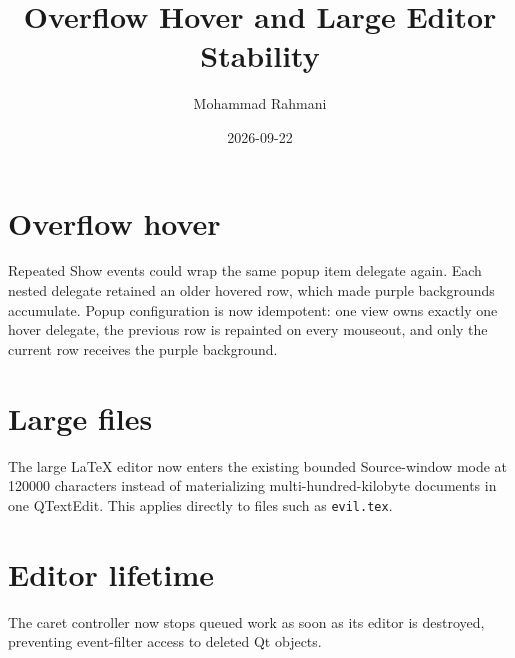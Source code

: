 \documentclass[a4paper]{article}
\title{Overflow Hover and Large Editor Stability}
\date{2026-09-22}
\author{Mohammad Rahmani}
\begin{document}
   \maketitle

   \begin{preview}
      \section{Overflow hover}
      Repeated Show events could wrap the same popup item delegate again. Each
      nested delegate retained an older hovered row, which made purple
      backgrounds accumulate. Popup configuration is now idempotent: one view
      owns exactly one hover delegate, the previous row is repainted on every
      mouseout, and only the current row receives the purple background.

      \section{Large files}
      The large LaTeX editor now enters the existing bounded Source-window mode
      at 120000 characters instead of materializing multi-hundred-kilobyte
      documents in one QTextEdit. This applies directly to files such as
      \texttt{evil.tex}.

      \section{Editor lifetime}
      The caret controller now stops queued work as soon as its editor is
      destroyed, preventing event-filter access to deleted Qt objects.
   \end{preview}

   
   
\end{document}
